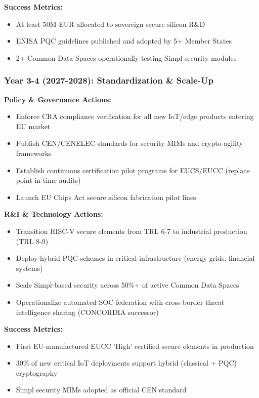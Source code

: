 \documentclass[12pt,a4paper]{article}
\begin{document}
\textbf{Success Metrics:}
\begin{itemize}
    \item At least 50M EUR allocated to sovereign secure silicon R\&D
    \item ENISA PQC guidelines published and adopted by 5+ Member States
    \item 2+ Common Data Spaces operationally testing Simpl security modules
\end{itemize}

\subsubsection*{Year 3-4 (2027-2028): Standardization \& Scale-Up}
\textbf{Policy \& Governance Actions:}
\begin{itemize}
    \item Enforce CRA compliance verification for all new IoT/edge products entering EU market
    \item Publish CEN/CENELEC standards for security MIMs and crypto-agility frameworks
    \item Establish continuous certification pilot programs for EUCS/EUCC (replace point-in-time audits)
    \item Launch EU Chips Act secure silicon fabrication pilot lines
\end{itemize}

\textbf{R\&I \& Technology Actions:}
\begin{itemize}
    \item Transition RISC-V secure elements from TRL 6-7 to industrial production (TRL 8-9)
    \item Deploy hybrid PQC schemes in critical infrastructure (energy grids, financial systems)
    \item Scale Simpl-based security across 50\%+ of active Common Data Spaces
    \item Operationalize automated SOC federation with cross-border threat intelligence sharing (CONCORDIA successor)
\end{itemize}

\textbf{Success Metrics:}
\begin{itemize}
    \item First EU-manufactured EUCC 'High' certified secure elements in production
    \item 30\% of new critical IoT deployments support hybrid (classical + PQC) cryptography
    \item Simpl security MIMs adopted as official CEN standard
\end{itemize}
\end{document}
